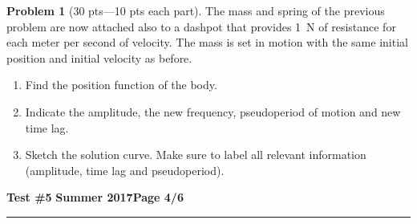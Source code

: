 \documentclass[12pt]{article}
\theoremstyle{definition}
\newtheorem{problem}{Problem}
\begin{document}
\bigskip
\begin{problem}[30 pts---10 pts each part]
The mass and spring of the previous problem are now attached also to a dashpot that provides 1~N of resistance for each meter per second of velocity.  The mass is set in motion with the same initial position and initial velocity as before.
\begin{enumerate}
  \item Find the position function of the body.
  \vspace{4cm}
  \begin{flushright}
  \end{flushright}
  \item Indicate the amplitude, the new frequency, pseudoperiod of motion and new time lag.
  \vspace{4cm}
  \begin{flushright}
  \end{flushright}
  \item Sketch the solution curve.  Make sure to label all relevant information (amplitude, time lag and pseudoperiod).
\end{enumerate}
\end{problem} 

\newpage

\hfill{\large\bf Test \#5}\hfill{\large\bf
  Summer 2017}\hfill{\large\bf Page 4/6}\hrule
\end{document}
